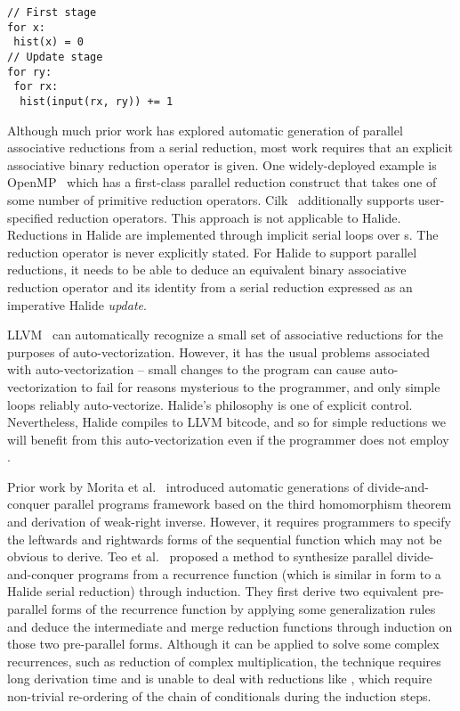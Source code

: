 \begin{lstlisting}[float,caption={Computing the histogram of an image is hard to parallelize in Halide, since its update stage would be expressed with serial \code{RVar}s.}, label={lst:histogram_loopness}]
// First stage
for x:
 hist(x) = 0
// Update stage
for ry:
 for rx:
  hist(input(rx, ry)) += 1
\end{lstlisting}

Although much prior work has explored automatic generation of parallel associative reductions from a serial reduction, most work requires that an explicit associative binary reduction operator is given. One widely-deployed example is OpenMP~\cite{Dagum:1998:OIA:615255.615542} which has a first-class parallel reduction construct that takes one of some number of primitive reduction operators. Cilk~\cite{Blumofe:1995:CEM:209936.209958} additionally supports user-specified reduction operators. This approach is not applicable to Halide. Reductions in Halide are implemented through implicit serial loops over s. The reduction operator is never explicitly stated. For Halide to support parallel reductions, it needs to be able to deduce an equivalent binary associative reduction operator and its identity from a serial reduction expressed as an imperative Halide \emph{update}.

LLVM~\cite{Lattner:2004:LCF:977395.977673} can automatically recognize a small set of associative reductions for the purposes of auto-vectorization. However, it has the usual problems associated with auto-vectorization -- small changes to the program can cause auto-vectorization to fail for reasons mysterious to the programmer, and only simple loops reliably auto-vectorize. Halide's philosophy is one of explicit control. Nevertheless, Halide compiles to LLVM bitcode, and so for simple reductions we will benefit from this auto-vectorization even if the programmer does not employ .

Prior work by Morita et al.~\cite{Morita:2007:AIG:1250734.1250752} introduced automatic generations of divide-and-conquer parallel programs framework based on the third homomorphism theorem and derivation of weak-right inverse. However, it requires programmers to specify the leftwards and rightwards forms of the sequential function which may not be obvious to derive. Teo et al.~\cite{Teo:1997:DEP:266670.266697} proposed a method to synthesize parallel divide-and-conquer
programs from a recurrence function (which is similar in form to a Halide serial reduction) through induction. They first derive two equivalent pre-parallel forms of the recurrence function by applying some generalization rules and deduce the intermediate and merge reduction functions through induction on those two pre-parallel forms. Although it can be applied to solve some complex recurrences, such as reduction of complex multiplication, the technique requires long derivation time and is unable to deal with reductions like , which require non-trivial re-ordering of the chain of conditionals during the induction steps.

